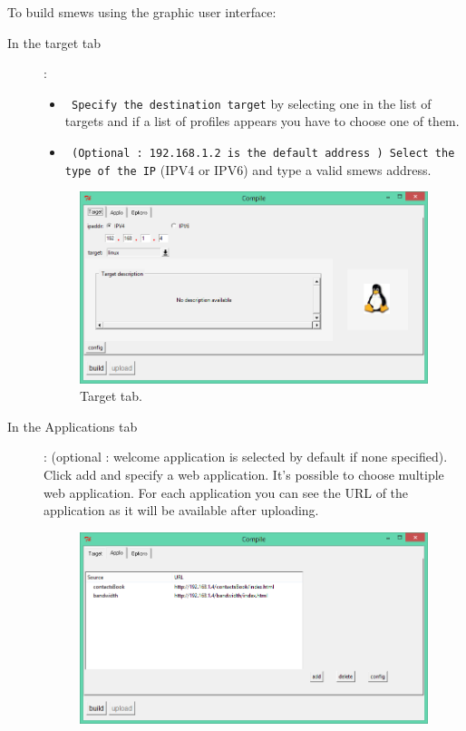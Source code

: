 \documentclass{report}
\begin{document}
To build smews using the graphic user
interface:
\begin{description}

 \item[In the target tab]:

\begin{itemize}
\item \verb+ Specify the destination target+ by selecting one in the list of
  targets and if a list of profiles appears you have to choose one of them.

\item
  \verb+ (Optional : 192.168.1.2 is the default address ) Select the type of the IP+
  (IPV4 or IPV6) and type a valid smews address.
\end{itemize}
\begin{figure}[H]
\centering
\includegraphics[scale=0.7]{TargetUI}
\caption{Target tab.}
\end{figure}
\item[In the Applications tab]: (optional : welcome application is selected by
  default if none specified). Click add and specify a web application. It’s
  possible to choose multiple web application. For each application you can see
  the URL of the application as it will be available after uploading.
\begin{figure}[H]
\centering
\includegraphics[scale=0.7]{AppsUI}

\end{figure}
\end{description}
\end{document}
